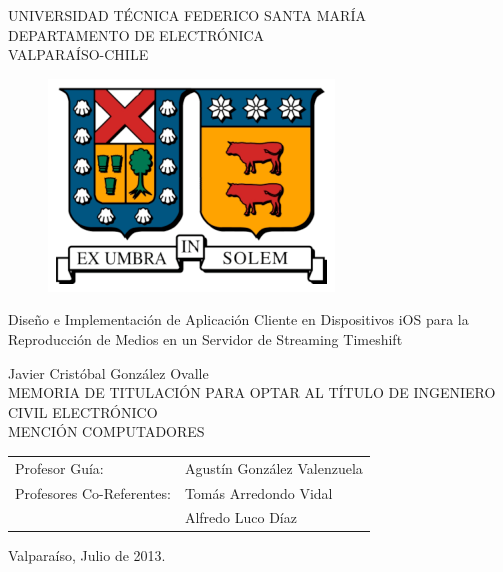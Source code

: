 \begin{titlepage}

\begin{center}

	\large  UNIVERSIDAD TÉCNICA FEDERICO SANTA MARÍA 	\\
 	\large \sc DEPARTAMENTO DE ELECTRÓNICA						\\
 	\large \sc VALPARAÍSO-CHILE												\\
\begin{figure}[h!]
	\centering
 	\includegraphics[scale=1]{imgs/logo_utfsm.eps} 
\end{figure}
\end{center}

\begin{center}
 \LARGE{Diseño e Implementación de Aplicación Cliente en Dispositivos iOS para la Reproducción de Medios en un Servidor de Streaming Timeshift}
\end{center}

\begin{center}
 \normalsize Javier Cristóbal González Ovalle\\
 \normalsize MEMORIA DE TITULACIÓN PARA OPTAR AL TÍTULO DE
 \normalsize INGENIERO CIVIL ELECTRÓNICO			\\
 \normalsize MENCIÓN COMPUTADORES
\end{center}
\vspace*{1.5cm}

\begin{center}
\begin{tabular}{ll}
 \normalsize Profesor Guía: & Agustín González Valenzuela\\
 \normalsize Profesores Co-Referentes: &Tomás Arredondo Vidal\\
 															&Alfredo Luco Díaz
\end{tabular}
\end{center}
 
\vspace*{2cm}
\begin{center}
 \normalsize Valparaíso, Julio de 2013. \\
\end{center}
\end{titlepage}